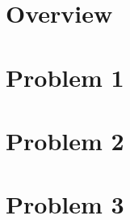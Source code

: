 \documentclass{report}
\begin{document}
  

  \tableofcontents{}
  \printindex{}

  \chapter{Overview}
    

  \chapter{Problem 1}
    

  \chapter{Problem 2}
    

  \chapter{Problem 3}
  

  
  
  \printindex
\end{document}

